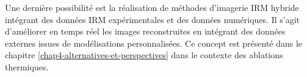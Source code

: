 
Une dernière possibilité est la réalisation de méthodes d'imagerie IRM hybride intégrant des données IRM expérimentales et des données numériques. Il s'agit d'améliorer en temps réel les images reconstruites en intégrant des données externes issues de modélisations personnalisées. Ce concept est présenté dans le chapitre \ref{chap4-alternatives-et-perspectives} dans le contexte des ablations thermiques.\\
